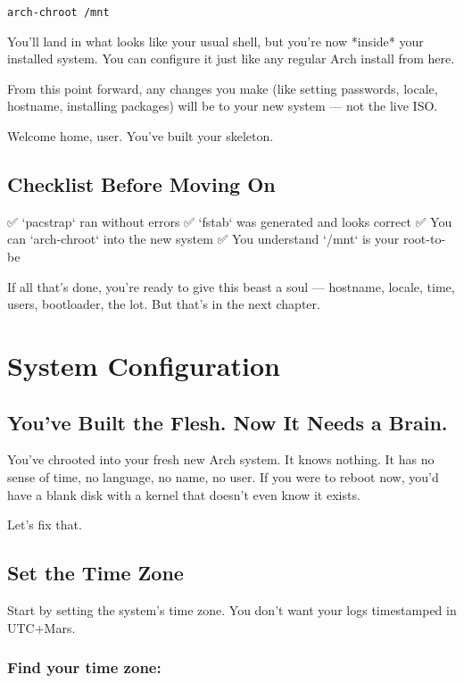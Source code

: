 \documentclass[12pt,openany]{book}
\begin{document}
\begin{lstlisting}
arch-chroot /mnt
\end{lstlisting}

You’ll land in what looks like your usual shell, but you're now *inside* your installed system. You can configure it just like any regular Arch install from here.

From this point forward, any changes you make (like setting passwords, locale, hostname, installing packages) will be to your new system — not the live ISO.

Welcome home, user. You’ve built your skeleton.

\section*{Checklist Before Moving On}

✅ `pacstrap` ran without errors  
✅ `fstab` was generated and looks correct  
✅ You can `arch-chroot` into the new system  
✅ You understand `/mnt` is your root-to-be

If all that's done, you’re ready to give this beast a soul — hostname, locale, time, users, bootloader, the lot. But that’s in the next chapter.

\clearpage


\chapter{System Configuration}

\section*{You've Built the Flesh. Now It Needs a Brain.}

You've chrooted into your fresh new Arch system. It knows nothing. It has no sense of time, no language, no name, no user. If you were to reboot now, you'd have a blank disk with a kernel that doesn't even know it exists.

Let’s fix that.

\section{Set the Time Zone}

Start by setting the system’s time zone. You don’t want your logs timestamped in UTC+Mars.

\subsection*{Find your time zone:}
\end{document}

